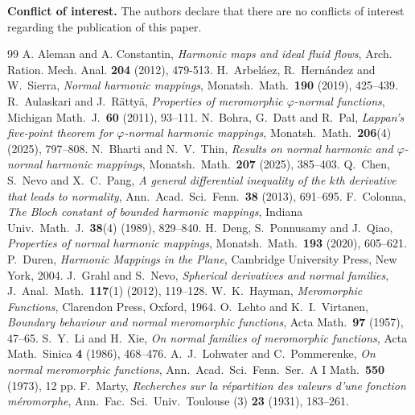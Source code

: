 \documentclass[10pt,a4paper]{amsart}
\begin{document}
\medskip
\noindent\textbf{Conflict of interest.} The authors declare that there are no conflicts of
interest regarding the publication of this paper.


\begin{thebibliography}{99}
 A. Aleman and A. Constantin, \emph{Harmonic maps and ideal fluid flows}, Arch. Ration. Mech. Anal. \textbf{204} (2012), 479-513.
 H.~Arbel\'aez, R.~Hern\'andez and W.~Sierra, \emph{Normal harmonic mappings}, Monatsh.\ Math.\ \textbf{190} (2019), 425--439.
 R.~Aulaskari and J.~R\"atty\"a, \emph{Properties of meromorphic $\varphi$-normal functions}, Michigan Math.\ J.\ \textbf{60} (2011), 93--111.
 N.~Bohra, G.~Datt and R.~Pal, \emph{Lappan's five-point theorem for $\varphi$-normal harmonic mappings}, Monatsh.\ Math.\ \textbf{206}(4) (2025), 797--808.
 N.~Bharti and N.~V.~Thin, \emph{Results on normal harmonic and $\varphi$-normal harmonic mappings}, Monatsh.\ Math.\ \textbf{207} (2025), 385--403.
 Q.~Chen, S.~Nevo and X.~C.~Pang, \emph{A general differential inequality of the $k$th derivative that leads to normality}, Ann.\ Acad.\ Sci.\ Fenn.\ \textbf{38} (2013), 691--695.
 F.~Colonna, \emph{The Bloch constant of bounded harmonic mappings}, Indiana Univ.\ Math.\ J.\ \textbf{38}(4) (1989), 829--840.
 H.~Deng, S.~Ponnusamy and J.~Qiao, \emph{Properties of normal harmonic mappings}, Monatsh.\ Math.\ \textbf{193} (2020), 605--621.
 P.~Duren, \emph{Harmonic Mappings in the Plane}, Cambridge University Press, New York, 2004.
 J.~Grahl and S.~Nevo, \emph{Spherical derivatives and normal families}, J.\ Anal.\ Math.\ \textbf{117}(1) (2012), 119--128.
 W.~K.~Hayman, \emph{Meromorphic Functions}, Clarendon Press, Oxford, 1964.
 O.~Lehto and K.~I.~Virtanen, \emph{Boundary behaviour and normal meromorphic functions}, Acta Math.\ \textbf{97} (1957), 47--65.
 S.~Y.~Li and H.~Xie, \emph{On normal families of meromorphic functions}, Acta Math.\ Sinica \textbf{4} (1986), 468--476.
 A.~J.~Lohwater and C.~Pommerenke, \emph{On normal meromorphic functions}, Ann.\ Acad.\ Sci.\ Fenn.\ Ser.\ A I Math.\ \textbf{550} (1973), 12 pp.
 F.~Marty, \emph{Recherches sur la r\'epartition des valeurs d'une fonction m\'eromorphe}, Ann.\ Fac.\ Sci.\ Univ.\ Toulouse (3) \textbf{23} (1931), 183--261.

\end{thebibliography}
\end{document}
